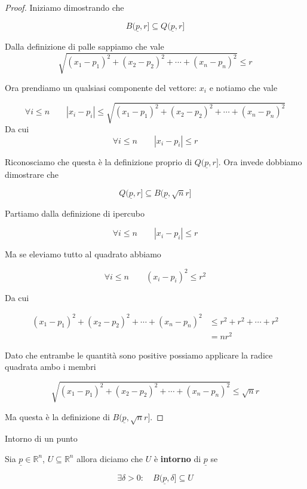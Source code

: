 \documentclass{rapport}
\begin{document}
\begin{proof}
 Iniziamo dimostrando che 

  \[
    B(\underline{p}, r]  \subseteq Q(\underline{p}, r] 
  \]


  Dalla definizione di palle sappiamo che vale 
  \[
  \sqrt{(x_1-p_1)^2+(x_2-p_2)^2+\cdots + (x_n-p_n)^2} \leq r
  \]

  Ora prendiamo un qualsiasi componente del vettore: $x_i$ e notiamo che vale 

  \[
  \forall i \leq n \qquad |x_i-p_i| \leq    \sqrt{(x_1-p_1)^2+(x_2-p_2)^2+\cdots + (x_n-p_n)^2} 
  \]
  Da cui
  \[
  \forall i \leq n \qquad  |x_i-p_i| \leq   r
  \]

  Riconosciamo che questa è la definizione proprio di $Q(\underline{p}, r] $. Ora invede dobbiamo dimostrare che 

  \[
    Q(\underline{p}, r]  \subseteq B(\underline{p}, \sqrt{n}r] 
  \]

  Partiamo dalla definizione di ipercubo

  \[
   \forall i \leq n \qquad  |x_i-p_i| \leq   r
  \]

  Ma se eleviamo tutto al quadrato abbiamo 


  \[
   \forall i \leq n \qquad  (x_i-p_i)^2 \leq   r^2
  \]

  Da cui 

  \begin{align*}
    (x_1-p_1)^2+(x_2-p_2)^2+\cdots + (x_n-p_n)^2   &\leq   r^2 +r^2 +\cdots + r^2 \\
    &= nr^2 
  \end{align*}
  
  

  Dato che entrambe le quantità sono positive possiamo applicare la radice quadrata ambo i membri

  \[
   \sqrt{(x_1-p_1)^2+(x_2-p_2)^2+\cdots + (x_n-p_n)^2}  \leq   \sqrt{n}r 
  \]

  Ma questa è la definizione di $B(\underline{p}, \sqrt{n}r] $.

  


\end{proof}

\newpage
\begin{definizione}{Intorno di un punto}{}
  
  Sia $\underline{p}\in \mathbb{R}^n$, $U \subseteq \mathbb{R}^n$ allora diciamo che $U$ è \textbf{intorno} di $\underline{p}$ se 

  \[
  \exists \delta > 0: \quad B(\underline{p}, \delta] \subseteq U
  \]
\end{definizione}
\end{document}
